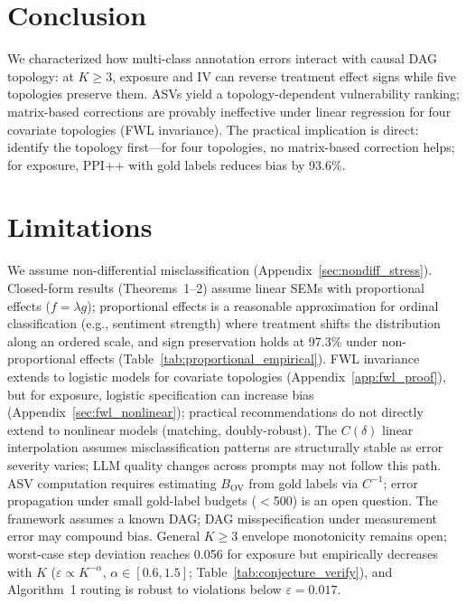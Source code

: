 \section{Conclusion}
\label{sec:conclusion}

We characterized how multi-class annotation errors interact with causal DAG topology: at $K{\geq}3$, exposure and IV can reverse treatment effect signs while five topologies preserve them. ASVs yield a topology-dependent vulnerability ranking; matrix-based corrections are provably ineffective under linear regression for four covariate topologies (FWL invariance). The practical implication is direct: identify the topology first---for four topologies, no matrix-based correction helps; for exposure, PPI++ with gold labels reduces bias by 93.6\%.

\section*{Limitations}

We assume non-differential misclassification (Appendix~\ref{sec:nondiff_stress}). Closed-form results (Theorems~1--2) assume linear SEMs with proportional effects ($f{=}\lambda g$); proportional effects is a reasonable approximation for ordinal classification (e.g., sentiment strength) where treatment shifts the distribution along an ordered scale, and sign preservation holds at 97.3\% under non-proportional effects (Table~\ref{tab:proportional_empirical}). FWL invariance extends to logistic models for covariate topologies (Appendix~\ref{app:fwl_proof}), but for exposure, logistic specification can increase bias (Appendix~\ref{sec:fwl_nonlinear}); practical recommendations do not directly extend to nonlinear models (matching, doubly-robust). The $C(\delta)$ linear interpolation assumes misclassification patterns are structurally stable as error severity varies; LLM quality changes across prompts may not follow this path. ASV computation requires estimating $B_{\mathrm{OV}}$ from gold labels via $C^{-1}$; error propagation under small gold-label budgets ($<$500) is an open question. The framework assumes a known DAG; DAG misspecification under measurement error may compound bias. General $K{\geq}3$ envelope monotonicity remains open; worst-case step deviation reaches 0.056 for exposure but empirically decreases with $K$ ($\varepsilon \propto K^{-\alpha}$, $\alpha \in [0.6, 1.5]$; Table~\ref{tab:conjecture_verify}), and Algorithm~1 routing is robust to violations below $\varepsilon{=}0.017$.
